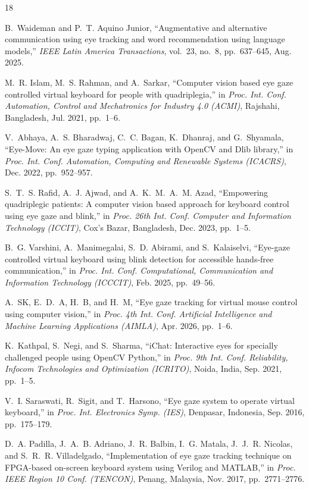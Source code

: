 \documentclass[conference]{IEEEtran}
\begin{document}
\begin{thebibliography}{18}
\scriptsize

B.~Waideman and P.~T. Aquino Junior, ``Augmentative and alternative
communication using eye tracking and word recommendation using language
models,'' \emph{IEEE Latin America Transactions}, vol.~23, no.~8,
pp.~637--645, Aug. 2025.

M.~R. Islam, M.~S. Rahman, and A.~Sarkar, ``Computer vision based eye gaze
controlled virtual keyboard for people with quadriplegia,'' in \emph{Proc. Int.
Conf. Automation, Control and Mechatronics for Industry 4.0 (ACMI)}, Rajshahi,
Bangladesh, Jul. 2021, pp.~1--6.

V.~Abhaya, A.~S. Bharadwaj, C.~C. Bagan, K.~Dhanraj, and G.~Shyamala,
``Eye-Move: An eye gaze typing application with OpenCV and Dlib library,'' in
\emph{Proc. Int. Conf. Automation, Computing and Renewable Systems (ICACRS)},
Dec. 2022, pp.~952--957.

S.~T.~S. Rafid, A.~J. Ajwad, and A.~K.~M.~A.~M. Azad, ``Empowering quadriplegic
patients: A computer vision based approach for keyboard control using eye gaze
and blink,'' in \emph{Proc. 26th Int. Conf. Computer and Information Technology
(ICCIT)}, Cox's Bazar, Bangladesh, Dec. 2023, pp.~1--5.

B.~G. Varshini, A.~Manimegalai, S.~D. Abirami, and S.~Kalaiselvi, ``Eye-gaze
controlled virtual keyboard using blink detection for accessible hands-free
communication,'' in \emph{Proc. Int. Conf. Computational, Communication and
Information Technology (ICCCIT)}, Feb. 2025, pp.~49--56.

A.~SK, E.~D.~A, H.~B, and H.~M, ``Eye gaze tracking for virtual mouse control
using computer vision,'' in \emph{Proc. 4th Int. Conf. Artificial Intelligence
and Machine Learning Applications (AIMLA)}, Apr. 2026, pp.~1--6.

K.~Kathpal, S.~Negi, and S.~Sharma, ``iChat: Interactive eyes for specially
challenged people using OpenCV Python,'' in \emph{Proc. 9th Int. Conf.
Reliability, Infocom Technologies and Optimization (ICRITO)}, Noida, India,
Sep. 2021, pp.~1--5.

V.~I. Saraswati, R.~Sigit, and T.~Harsono, ``Eye gaze system to operate virtual
keyboard,'' in \emph{Proc. Int. Electronics Symp. (IES)}, Denpasar, Indonesia,
Sep. 2016, pp.~175--179.

D.~A. Padilla, J.~A.~B. Adriano, J.~R. Balbin, I.~G. Matala, J.~J.~R. Nicolas,
and S.~R.~R. Villadelgado, ``Implementation of eye gaze tracking technique on
FPGA-based on-screen keyboard system using Verilog and MATLAB,'' in
\emph{Proc. IEEE Region 10 Conf. (TENCON)}, Penang, Malaysia, Nov. 2017,
pp.~2771--2776.


\end{thebibliography}
\end{document}
